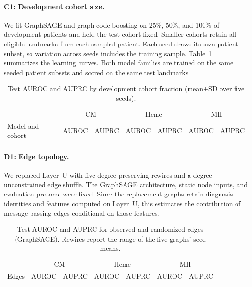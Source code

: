 \paragraph{C1: Development cohort size.}
We fit GraphSAGE and graph-code boosting on 25\%, 50\%, and 100\% of development patients and held the test cohort fixed. Smaller cohorts retain all eligible landmarks from each sampled patient. Each seed draws its own patient subset, so variation across seeds includes the training sample. Table~\ref{tab:scale-ap} summarizes the learning curves. Both model families are trained on the same seeded patient subsets and scored on the same test landmarks.

\begin{table}[t]
\centering
\caption{Test AUROC and AUPRC by development cohort fraction (mean\(\pm\)SD over five seeds).}
\label{tab:scale-ap}
\small
\begin{tabular}{lcccccc}
\hline
 & \multicolumn{2}{c}{CM} & \multicolumn{2}{c}{Heme} & \multicolumn{2}{c}{MH} \\
Model and cohort & AUROC & AUPRC & AUROC & AUPRC & AUROC & AUPRC \\
\hline

\hline
\end{tabular}
\end{table}


\paragraph{D1: Edge topology.}
We replaced Layer~U with five degree-preserving rewires and a degree-unconstrained edge shuffle. The GraphSAGE architecture, static node inputs, and evaluation protocol were fixed. Since the replacement graphs retain diagnosis identities and features computed on Layer~U, this estimates the contribution of message-passing edges conditional on those features.

\begin{table}[t]
\centering
\caption{Test AUROC and AUPRC for observed and randomized edges (GraphSAGE). Rewires report the range of the five graphs' seed means.}
\label{tab:null-ap}
\small
\begin{tabular}{lcccccc}
\hline
 & \multicolumn{2}{c}{CM} & \multicolumn{2}{c}{Heme} & \multicolumn{2}{c}{MH} \\
Edges & AUROC & AUPRC & AUROC & AUPRC & AUROC & AUPRC \\
\hline

\hline
\end{tabular}
\end{table}

